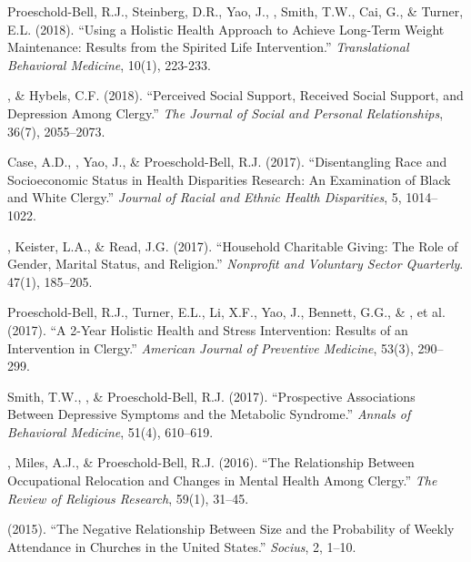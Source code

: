 \begin{etaremune}
\item Proeschold-Bell, R.J., Steinberg, D.R., Yao, J., \Eagle, Smith, T.W., Cai, G., \& Turner, E.L. (2018). ``Using a Holistic Health Approach to Achieve Long-Term Weight Maintenance: Results from the Spirited Life Intervention.'' \emph{Translational Behavioral Medicine}, 10(1), 223-233. 

\item \Eagle, \& Hybels, C.F. (2018). ``Perceived Social Support, Received Social Support, and Depression Among Clergy.'' \emph{The Journal of Social and Personal Relationships}, 36(7), 2055--2073. 

\item Case, A.D., \Eagle, Yao, J., \& Proeschold-Bell, R.J. (2017). ``Disentangling Race and Socioeconomic Status in Health Disparities Research: An Examination of Black and White Clergy.'' \emph{Journal of Racial and Ethnic Health Disparities}, 5, 1014--1022. 

\item \Eagle, Keister, L.A., \& Read, J.G. (2017). ``Household Charitable Giving: The Role of Gender, Marital Status, and Religion.'' \emph{Nonprofit and Voluntary Sector Quarterly}. 47(1), 185--205. 

\item Proeschold-Bell, R.J., Turner, E.L., Li, X.F., Yao, J., Bennett, G.G., \& \Eagle, et al. (2017). ``A 2-Year Holistic Health and Stress Intervention: Results of an Intervention in Clergy.'' \emph{American Journal of Preventive Medicine}, 53(3), 290--299. 

\item Smith, T.W., \Eagle\CF, \& Proeschold-Bell, R.J. (2017). ``Prospective Associations Between Depressive Symptoms and the Metabolic Syndrome.'' \emph{Annals of Behavioral Medicine}, 51(4), 610--619. 

\item \Eagle, Miles, A.J., \& Proeschold-Bell, R.J. (2016). ``The Relationship Between Occupational Relocation and Changes in Mental Health Among Clergy.'' \emph{The Review of Religious Research}, 59(1), 31--45. 

\item \Eagle \hspace{.01em} (2015). ``The Negative Relationship Between Size and the Probability of Weekly Attendance in Churches in the United States.'' \emph{Socius}, 2, 1--10. 


\end{etaremune}
